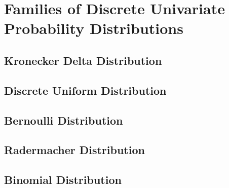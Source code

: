 \documentclass[11pt]{report} %
\begin{document}
\section{Families of Discrete Univariate Probability Distributions}

\subsection{Kronecker Delta Distribution}

\subsection{Discrete Uniform Distribution}

\subsection{Bernoulli Distribution}

\subsection{Radermacher Distribution}

\subsection{Binomial Distribution}
\end{document}
